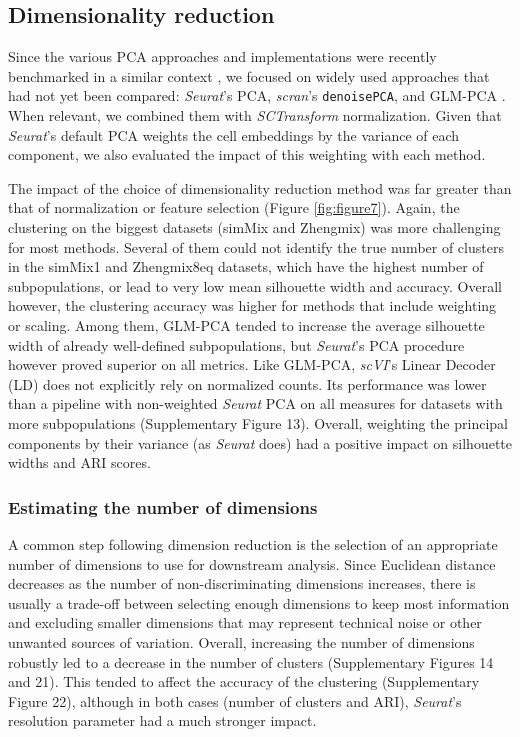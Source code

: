 \documentclass{bmcart}
\begin{document}
\subsection*{Dimensionality reduction}

Since the various PCA approaches and implementations were recently benchmarked in a similar context \cite{TsuyuzakiPCA2020}, we focused on widely used approaches that had not yet been compared: \textit{Seurat}'s PCA, \textit{scran}'s \texttt{denoisePCA}, and GLM-PCA \cite{townesGlmpca2019}. When relevant, we combined them with \textit{SCTransform} normalization. Given that \textit{Seurat}'s default PCA weights the cell embeddings by the variance of each component, we also evaluated the impact of this weighting with each method.

The impact of the choice of dimensionality reduction method was far greater than that of normalization or feature selection (Figure \ref{fig:figure7}). Again, the clustering on the biggest datasets (simMix and Zhengmix) was more challenging for most methods. Several of them could not identify the true number of clusters in the simMix1 and Zhengmix8eq datasets, which have the highest number of subpopulations, or lead to very low mean silhouette width and accuracy. Overall however, the clustering accuracy was higher for methods that include weighting or scaling. Among them, GLM-PCA tended to increase the average silhouette width of already well-defined subpopulations, but \textit{Seurat}'s PCA procedure however proved superior on all metrics. Like GLM-PCA, \textit{scVI}'s Linear Decoder (LD) does not explicitly rely on normalized counts. Its performance was lower than a pipeline with non-weighted \textit{Seurat} PCA on all measures for datasets with more subpopulations (Supplementary Figure 13). 
Overall, weighting the principal components by their variance (as \textit{Seurat} does) had a positive impact on silhouette widths and ARI scores.

\subsubsection*{Estimating the number of dimensions}

A common step following dimension reduction is the selection of an appropriate number of dimensions to use for downstream analysis. Since Euclidean distance decreases as the number of non-discriminating dimensions increases, there is usually a trade-off between selecting enough dimensions to keep most information and excluding smaller dimensions that may represent technical noise or other unwanted sources of variation. Overall, increasing the number of dimensions robustly led to a decrease in the number of clusters (Supplementary Figures 14 and 21). This tended to affect the accuracy of the clustering (Supplementary Figure 22), although in both cases (number of clusters and ARI), \textit{Seurat}'s resolution parameter had a much stronger impact.
\end{document}
